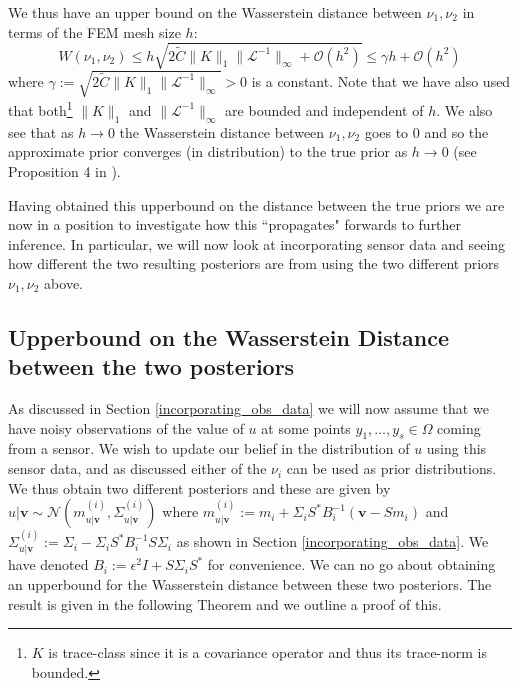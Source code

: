 We thus have an upper bound on the Wasserstein distance between $\nu_{1},\nu_{2}$ in terms of the FEM mesh size $h$:
\begin{equation}
    W(\nu_{1},\nu_{2})\leq h \sqrt{2\tilde{C}\|K\|_{1}\|\mathcal{L}^{-1}\|_{\infty}+\mathcal{O}(h^2)}\leq \gamma h +\mathcal{O}(h^2)
\end{equation}
where $\gamma:=\sqrt{2\tilde{C}\|K\|_{1}\|\mathcal{L}^{-1}\|_{\infty}}>0$ is a constant. Note that we have also used that both\footnote{$K$ is trace-class since it is a covariance operator and thus its trace-norm is bounded.} $\|K\|_{1}$ and $\|\mathcal{L}^{-1}\|_{\infty}$ are bounded and independent of $h$. We also see that as $h\rightarrow 0$ the Wasserstein distance between $\nu_1,\nu_2$ goes to 0 and so the approximate prior converges (in distribution) to the true prior as $h\rightarrow 0$ (see Proposition 4 in \textcolor{blue}{\citep{masarotto2019procrustes}}).
\qedsymbol

Having obtained this upperbound on the distance between the true priors we are now in a position to investigate how this ``propagates" forwards to further inference. In particular, we will now look at incorporating sensor data and seeing how different the two resulting posteriors are from using the two different priors $\nu_1,\nu_2$ above.

\subsection{Upperbound on the Wasserstein Distance between the two posteriors}

As discussed in Section \textcolor{blue}{\ref{incorporating_obs_data}} we will now assume that we have noisy observations of the value of $u$ at some points $y_1,\dots,y_s\in\Omega$ coming from a sensor. We wish to update our belief in the distribution of $u$ using this sensor data, and as discussed either of the $\nu_i$ can be used as prior distributions. We thus obtain two different posteriors and these are given by $u|\mathbf{v}\sim\mathcal{N}(m^{(i)}_{u|\mathbf{v}},\Sigma^{(i)}_{u|\mathbf{v}})$ where $m^{(i)}_{u|\mathbf{v}}:=m_{i}+\Sigma_{i}S^{*}B_{i}^{-1}(\mathbf{v}-Sm_{i})$ and $\Sigma^{(i)}_{u|\mathbf{v}}:=\Sigma_{i}-\Sigma_{i}S^{*}B_{i}^{-1}S\Sigma_{i}$ as shown in Section \textcolor{blue}{\ref{incorporating_obs_data}}. We have denoted $B_{i}:=\epsilon^{2}I+S\Sigma_{i}S^{*}$ for convenience. We can no go about obtaining an upperbound for the Wasserstein distance between these two posteriors. The result is given in the following Theorem and we outline a proof of this.
\vspace{5pt}

